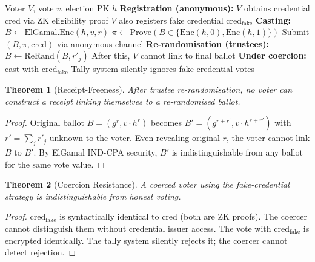 \documentclass[11pt,a4paper]{article}
\newtheorem{theorem}{Theorem}[section]
\begin{document}
\begin{algorithm}[H]
\caption{Coercion-Resistant Vote Casting}
\label{alg:cr-vote}
\begin{algorithmic}[1]
\Require Voter $V$, vote $v$, election PK $h$
\State \textbf{Registration (anonymous):}
\State $V$ obtains credential $\mathrm{cred}$ via ZK eligibility proof
\State $V$ also registers fake credential $\mathrm{cred}_{\mathrm{fake}}$
\State
\State \textbf{Casting:}
\State $B \gets \mathrm{ElGamal.Enc}(h, v, r)$
\State $\pi \gets \mathrm{Prove}(B \in \{\mathrm{Enc}(h,0), \mathrm{Enc}(h,1)\})$
\State Submit $(B, \pi, \mathrm{cred})$ via anonymous channel
\State
\State \textbf{Re-randomisation (trustees):}
    \State $B \gets \mathrm{ReRand}(B, r'_j)$
\EndFor
\State After this, $V$ cannot link to final ballot
\State
\State \textbf{Under coercion:} cast with $\mathrm{cred}_{\mathrm{fake}}$
\State Tally system silently ignores fake-credential votes
\end{algorithmic}
\end{algorithm}

\begin{theorem}[Receipt-Freeness]
    After trustee re-randomisation, no voter can construct a receipt
    linking themselves to a re-randomised ballot.
\end{theorem}

\begin{proof}
    Original ballot $B = (g^r, v \cdot h^r)$ becomes
    $B' = (g^{r+r'}, v \cdot h^{r+r'})$ with $r' = \sum_j r'_j$ unknown
    to the voter.  Even revealing original $r$, the voter cannot link $B$
    to $B'$.  By ElGamal IND-CPA security, $B'$ is indistinguishable from
    any ballot for the same vote value.
\end{proof}

\begin{theorem}[Coercion Resistance]
    A coerced voter using the fake-credential strategy is
    indistinguishable from honest voting.
\end{theorem}

\begin{proof}
    $\mathrm{cred}_{\mathrm{fake}}$ is syntactically identical to
    $\mathrm{cred}$ (both are ZK proofs).  The coercer cannot distinguish
    them without credential issuer access.  The vote with
    $\mathrm{cred}_{\mathrm{fake}}$ is encrypted identically.  The tally
    system silently rejects it; the coercer cannot detect rejection.
\end{proof}
\end{document}
